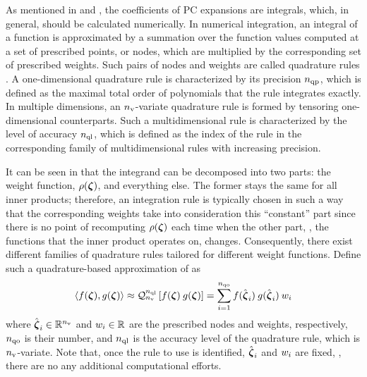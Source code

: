 As mentioned in  and , the coefficients of PC expansions are integrals, which, in general, should be calculated numerically. In numerical integration, an integral of a function is approximated by a summation over the function values computed at a set of prescribed points, or nodes, which are multiplied by the corresponding set of prescribed weights. Such pairs of nodes and weights are called quadrature rules \cite{press2007}. A one-dimensional quadrature rule is characterized by its precision ${n_\text{qp}}$, which is defined as the maximal total order \cite{heiss2008} of polynomials that the rule integrates exactly. In multiple dimensions, an ${n_\text{v}}$-variate quadrature rule is formed by tensoring one-dimensional counterparts. Such a multidimensional rule is characterized by the level of accuracy ${n_\text{ql}}$, which is defined as the index of the rule in the corresponding family of multidimensional rules with increasing precision.

It can be seen in  that the integrand can be decomposed into two parts: the weight function, $\rho(\boldsymbol{\zeta})$, and everything else. The former stays the same for all inner products; therefore, an integration rule is typically chosen in such a way that the corresponding weights take into consideration this ``constant'' part since there is no point of recomputing $\rho(\boldsymbol{\zeta})$ each time when the other part, \ie, the functions that the inner product operates on, changes. Consequently, there exist different families of quadrature rules tailored for different weight functions. Define such a quadrature-based approximation of  as
\[
  \oInner{f(\vz)}{g(\vz)} \approx \oQuad{\nvars}{\qdlevel}{f(\vz) \: g(\vz)} = \sum_{i = 1}^{\qdorder} f(\qdn{\vz}_i) \: g(\qdn{\vz}_i) \: \qdw_i
\]
where $\hat{\boldsymbol{\zeta}}_i \in \mathbb{R}^{n_\text{v}}$ and $w_i \in \mathbb{R}$ are the prescribed nodes and weights, respectively, ${n_\text{qo}}$ is their number, and ${n_\text{ql}}$ is the accuracy level of the quadrature rule, which is ${n_\text{v}}$-variate. Note that, once the rule to use is identified, $\hat{\boldsymbol{\zeta}}_i$ and $w_i$ are fixed, \ie, there are no any additional computational efforts.

